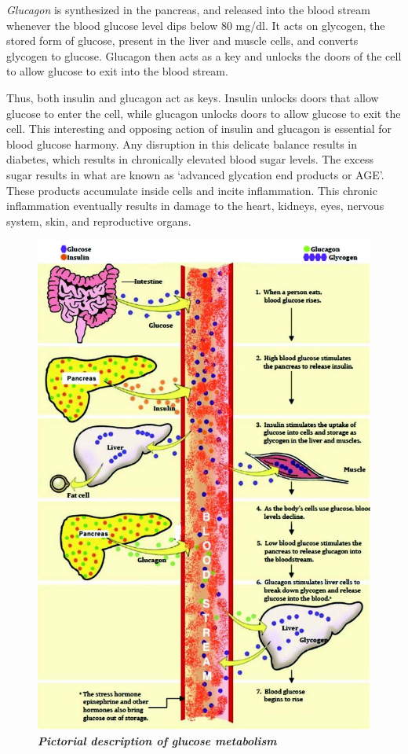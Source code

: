 \vskip 6pt
\textit{Glucagon} is synthesized in the pancreas, and released into the blood stream whenever the blood glucose level dips below 80 mg/dl. It acts on glycogen, the stored form of glucose, present in the liver and muscle cells, and converts glycogen to glucose. Glucagon then acts as a key and unlocks the doors of the cell to allow glucose to exit into the blood stream.

\vskip 6pt
Thus, both insulin and glucagon act as keys. Insulin unlocks doors that allow glucose to enter the cell, while glucagon unlocks doors to allow glucose to exit the cell. This interesting and opposing action of insulin and glucagon is essential for blood glucose harmony. Any disruption in this delicate balance results in diabetes, which results in chronically elevated blood sugar levels. The excess sugar results in what are known as ‘advanced glycation end products or AGE’. These products accumulate inside cells and incite inflammation. This chronic inflammation eventually results in damage to the heart, kidneys, eyes, nervous system, skin, and reproductive organs.

\begin{figure}[h]
\centering
\includegraphics[scale=2.5]{images/018.jpg}\\
\textbf{\textit{Pictorial description of glucose metabolism}}
\end{figure}


